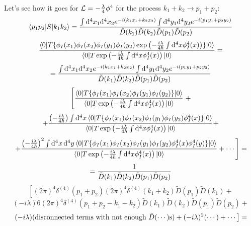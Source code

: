 Let's see how it goes for ${\mathcal L}=-{\lambda\over4}\phi^4$ for the process $k_1+k_2\to p_1+p_2$: 
\begin{equation*}
  \mathinner{\langle{p_1 p_2|S|k_1 k_2}\rangle} = {\int{\rm d}^4 x_1{\rm d}^4 x_2 e^{-i(k_1x_1+k_2x_2)} \int{\rm d}^4 y_1{\rm d}^4 y_2 e^{-i(p_1y_1+p_2y_2)} \over \tilde D(k_1)\tilde D(k_2) \tilde D(p_1)\tilde D(p_2)}
\end{equation*}
\begin{equation*}
  {\mathinner{\langle{0|T\{\phi_I(x_1)\phi_I(x_2)\phi_I(y_1)\phi_I(y_2)\exp\left( -{i\lambda\over4\hbar} \int{\rm d}^4 x \phi_I^4(x) \right)\}|0}\rangle} \over \mathinner{\langle{0|T\exp\left(-{i\lambda\over4\hbar}\int{\rm d}^4 x \phi_I^4(x) \right)|0}\rangle} }=
\end{equation*}
\begin{equation*}
  = {\int{\rm d}^4 x_1{\rm d}^4 x_2 e^{-i(k_1x_1+k_2x_2)} \int{\rm d}^4 y_1{\rm d}^4 y_2 e^{-i(p_1y_1+p_2y_2)} \over \tilde D(k_1)\tilde D(k_2) \tilde D(p_1)\tilde D(p_2)}
\end{equation*}
\begin{equation*}
  \left[ { \mathinner{\langle{0|T\{\phi_I(x_1)\phi_I(x_2)\phi_I(y_1)\phi_I(y_2)\}|0}\rangle} \over \mathinner{\langle{0|T\exp\left(-{i\lambda\over4\hbar}\int{\rm d}^4 x \phi_I^4(x) \right)|0}\rangle} }\right. +
\end{equation*}
\begin{equation*}
  +{ \left(-{i\lambda\over4\hbar}\right)\int{\rm d}^4 x \mathinner{\langle{0|T\{\phi_I(x_1)\phi_I(x_2) \phi_I(y_1)\phi_I(y_2) \phi_I^4(x)\}|0}\rangle} \over \mathinner{\langle{0|T\exp\left(-{i\lambda\over4\hbar}\int{\rm d}^4 x \phi_I^4(x) \right)|0}\rangle} } +
\end{equation*}
\begin{equation*}
  \left. +{ \left(-{i\lambda\over4\hbar}\right)^2\int{\rm d}^4 x\,{\rm d}^4 y \mathinner{\langle{0|T\{\phi_I(x_1)\phi_I(x_2) \phi_I(y_1)\phi_I(y_2) \phi_I^4(x)\phi_I^4(y)\}|0}\rangle} \over \mathinner{\langle{0|T\exp\left(-{i\lambda\over4\hbar}\int{\rm d}^4 x \phi_I^4(x) \right)|0}\rangle} } +\cdots\right]=
\end{equation*}
\begin{equation*}
  = { 1 \over \tilde D(k_1)\tilde D(k_2) \tilde D(p_1)\tilde D(p_2)}
\end{equation*}
\begin{equation*}
  \left[ (2\pi)^4 \delta^{(4)}(p_1+p_2)(2\pi)^4 \delta^{(4)}(k_1+k_2)\tilde D(p_1) \tilde D(k_1)+\right.
\end{equation*}
\begin{equation*}
  (-i\lambda)6(2\pi)^4\delta^{(4)}(p_1+p_2-k_1-k_2)\tilde D(k_1)\tilde D(k_2) \tilde D(p_1)\tilde D(p_2)+
\end{equation*}
\begin{equation*}
  \left. (-i\lambda)(\hbox{disconnected terms with not enough $\tilde D(\cdots)$s})+(-i\lambda)^2(\cdots)+\cdots\right]=
\end{equation*}
